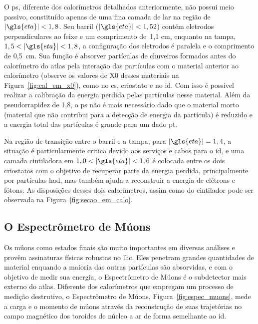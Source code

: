 O \gls{ps}, diferente dos calorímetros detalhados anteriormente, não possui meio passivo, 
constituído apenas de uma fina camada de \gls{lar} na região de
$|\gls{eta}|<1,8$. Seu barril ($|\gls{eta}|<1,52$) contém eletrodos
perpendiculares ao feixe e um comprimento de~1,1 cm, enquanto na tampa,
$1,5<|\gls{eta}|<1,8$, a configuração dos eletrodos é paralela e o comprimento
de 0,5~cm. Sua função é absorver partículas de chuveiros formados antes do
calorímetro do \gls{atlas} pela interação das partículas com o material anterior
ao calorímetro (observe os valores de \gls{X0} desses materiais na Figura~\ref{fig:cal_em_x0}), 
como no \gls{cs}, criostato e no \gls{id}. Com isso é possível realizar 
a calibração da energia perdida pelas partículas nesse material.
Além da pseudorrapidez de 1,8, o \gls{ps} não é mais 
necessário dado que o material morto (material que não contribui para a detecção
de energia da partícula) é reduzido e a energia total das partículas 
é grande para um dado \gls{pt}.

Na região de transição entre o barril e a tampa, para
$|\gls{eta}| = 1,4$, a situação é particularmente critica devido aos serviços e
cabos para o \gls{id}, e uma camada cintiladora em $1,0<|\gls{eta}|<1,6$ 
é colocada entre os dois criostatos com o objetivo de recuperar parte 
da energia perdida, principalmente por
partículas \gls{had}, mas também ajuda a reconstruir a energia de elétrons e
fótons. As disposições desses dois calorímetros, assim como do cintilador pode 
ser observada na Figura~\ref{fig:secao_em_calo}. 

\newpage
\subsection{O Espectrômetro de Múons}
\label{ssec:espectometro_muons}

Os múons como estados finais são muito importantes em diversas análises e provêm
assinaturas físicas robustas no \gls{lhc}. 
Eles penetram grandes quantidades de material enquando a maioria das outras
partículas são absorvidas, e com o objetivo de medir sua energia, o Espectrômetro
de Múons \cite{muon_tdr} é o subdetector mais externo do \gls{atlas}. Diferente dos calorímetros
que empregam um processo de medição destrutivo, o Espectrômetro de Múons,
Figura~\ref{fig:espec_muons}, mede a carga e o momento de múons através 
da reconstrução de suas trajetórias no 
campo magnético dos toroides de núcleo a ar de forma semelhante ao \gls{id}. 

